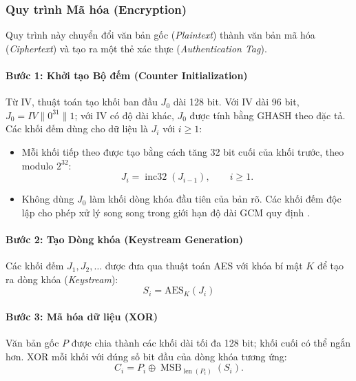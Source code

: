 \subsubsection{Quy trình Mã hóa (Encryption)}
Quy trình này chuyển đổi văn bản gốc (\textit{Plaintext}) thành văn bản mã hóa (\textit{Ciphertext}) và tạo ra một thẻ xác thực (\textit{Authentication Tag}).

\paragraph{Bước 1: Khởi tạo Bộ đếm (Counter Initialization)}
Từ IV, thuật toán tạo khối ban đầu $J_0$ dài 128 bit. Với IV dài 96 bit, $J_0=IV\parallel 0^{31}\parallel 1$; với IV có độ dài khác, $J_0$ được tính bằng GHASH theo đặc tả. Các khối đếm dùng cho dữ liệu là $J_i$ với $i\geq1$:
\begin{itemize}
    \item Mỗi khối tiếp theo được tạo bằng cách tăng 32 bit cuối của khối trước, theo modulo $2^{32}$:
    \begin{equation}
        J_i = \operatorname{inc32}(J_{i-1}),\qquad i\geq1.
    \end{equation}
    \item Không dùng $J_0$ làm khối dòng khóa đầu tiên của bản rõ. Các khối đếm độc lập cho phép xử lý song song trong giới hạn độ dài GCM quy định \cite{gcmnist}.
\end{itemize}

\paragraph{Bước 2: Tạo Dòng khóa (Keystream Generation)}
Các khối đếm $J_1, J_2, \dots$ được đưa qua thuật toán AES với khóa bí mật $K$ để tạo ra dòng khóa (\textit{Keystream}):
\begin{equation}
    S_i = \text{AES}_K(J_i)
\end{equation}

\paragraph{Bước 3: Mã hóa dữ liệu (XOR)}
Văn bản gốc $P$ được chia thành các khối dài tối đa 128 bit; khối cuối có thể ngắn hơn. XOR mỗi khối với đúng số bit đầu của dòng khóa tương ứng:
\begin{equation}
    C_i=P_i\oplus\operatorname{MSB}_{\operatorname{len}(P_i)}(S_i).
\end{equation}

